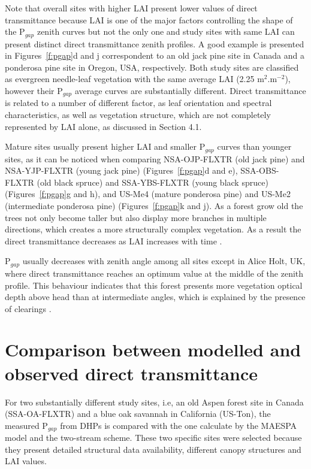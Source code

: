 \documentclass[a4paper,11pt]{report}
\begin{document}
Note that overall sites with higher LAI present lower values of direct transmittance because LAI is one of the major factors controlling the shape of the P$_{gap}$ zenith curves but not the only one and study sites with same LAI can present distinct direct transmittance zenith profiles. A good example is presented in Figures~\ref{f:pgap}d and j correspondent to an old jack pine site in Canada and a ponderosa pine site in Oregon, USA, respectively. Both study sites are classified as evergreen needle-leaf vegetation with the same average LAI (2.25 m$^2$.m$^{-2}$), however their P$_{gap}$ average curves are substantially different. Direct transmittance is related to a number of different factor, as leaf orientation and spectral characteristics, as well as vegetation structure, which are not completely represented by LAI alone, as discussed in Section 4.1.

Mature sites usually present higher LAI and smaller P$_{gap}$ curves than younger sites, as it can be noticed when comparing NSA-OJP-FLXTR (old jack pine) and NSA-YJP-FLXTR (young jack pine) (Figures~\ref{f:pgap}d and e), SSA-OBS-FLXTR (old black spruce) and SSA-YBS-FLXTR (young black spruce) (Figures~\ref{f:pgap}g and h), and US-Me4 (mature ponderosa pine) and US-Me2 (intermediate ponderosa pine) (Figures~\ref{f:pgap}k and j). As a forest grow old the trees not only become taller but also display more branches in multiple directions, which creates a more structurally complex vegetation. As a result the direct transmittance decreases as LAI increases with time \citep{Law2001b}.

P$_{gap}$ usually decreases with zenith angle among all sites except in Alice Holt, UK, where direct transmittance reaches an optimum value at the middle of the zenith profile. This behaviour indicates that this forest presents more vegetation optical depth above head than at intermediate angles, which is explained by the presence of clearings \citep{Benham2012}.

\section{Comparison between modelled and observed direct transmittance}\label{section:MAESPA_build}

For two substantially different study sites, i.e, an old Aspen forest site in Canada (SSA-OA-FLXTR) and a blue oak savannah in California (US-Ton), the measured P$_{gap}$ from DHPs is compared with the one calculate by the MAESPA model and the two-stream scheme. These two specific sites were selected because they present detailed structural data availability, different canopy structures and LAI values.
\end{document}

